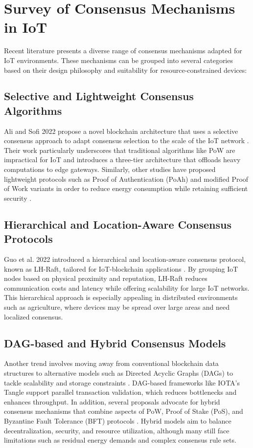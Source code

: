 \documentclass[12pt,onecolumn]{IEEEtran} %
\begin{document}
\section{Survey of Consensus Mechanisms in IoT}\label{sec:consensus-survey}
Recent literature presents a diverse range of consensus mechanisms adapted for IoT environments. These mechanisms can be grouped into several categories based on their design philosophy and suitability for resource-constrained devices:

  \subsection{Selective and Lightweight Consensus Algorithms}\label{subsec:consensus-light}
Ali and Sofi 2022 propose a novel blockchain architecture that uses a selective consensus approach to adapt consensus selection to the scale of the IoT network \cite{ali2022blockchainenabledarchitecture}. Their work particularly underscores that traditional algorithms like PoW are impractical for IoT and introduces a three-tier architecture that offloads heavy computations to edge gateways. Similarly, other studies have proposed lightweight protocols such as Proof of Authentication (PoAh) and modified Proof of Work variants in order to reduce energy consumption while retaining sufficient security \cite{haque2024ascalableblockchain, khan2022asurveyand}.

  \subsection{Hierarchical and Location-Aware Consensus Protocols}\label{subsec:consensus-hier}
Guo et al. 2022 introduced a hierarchical and location-aware consensus protocol, known as LH-Raft, tailored for IoT-blockchain applications \cite{guo2022ahierarchicaland}. By grouping IoT nodes based on physical proximity and reputation, LH-Raft reduces communication costs and latency while offering scalability for large IoT networks. This hierarchical approach is especially appealing in distributed environments such as agriculture, where devices may be spread over large areas and need localized consensus.

  \subsection{DAG-based and Hybrid Consensus Models}\label{subsec:consensus-dag}
Another trend involves moving away from conventional blockchain data structures to alternative models such as Directed Acyclic Graphs (DAGs) to tackle scalability and storage constraints \cite{khan2022asurveyand, bryant2022keychallengesin}. DAG-based frameworks like IOTA's Tangle support parallel transaction validation, which reduces bottlenecks and enhances throughput. In addition, several proposals advocate for hybrid consensus mechanisms that combine aspects of PoW, Proof of Stake (PoS), and Byzantine Fault Tolerance (BFT) protocols \cite{guru2023asurveyon, khan2022asurveyand}. Hybrid models aim to balance decentralization, security, and resource utilization, although many still face limitations such as residual energy demands and complex consensus rule sets.
\end{document}
